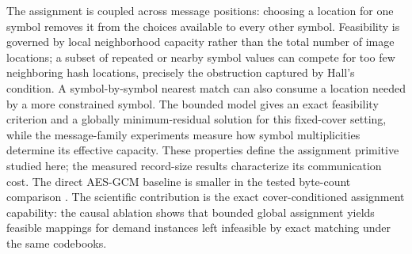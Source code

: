 \documentclass[preprint,12pt]{elsarticle}
\theoremstyle{plain}
\providecommand{\DIFaddtex}[1]{{\protect\color{blue} \sf #1}} %
\providecommand{\DIFdeltex}[1]{{\protect\color{red} \scriptsize #1}} %
\providecommand{\DIFaddbegin}{} %
\providecommand{\DIFaddend}{} %
\providecommand{\DIFdelbegin}{} %
\providecommand{\DIFdelend}{} %
\providecommand{\DIFadd}[1]{\texorpdfstring{\DIFaddtex{#1}}{#1}} %
\providecommand{\DIFdel}[1]{\texorpdfstring{\DIFdeltex{#1}}{}} %
\providecommand{\DIFscaledelfig}{0.5}
\newlength{\DIFdelgraphicswidth} %
\newlength{\DIFdelgraphicsheight} %
\providecommand{\DIFaddincludegraphics}[2][]{{\color{blue}\fbox{\DIFOincludegraphics[#1]{#2}}}} %
\providecommand{\DIFdelincludegraphics}[2][]{%
\sbox{\DIFdelgraphicsbox}{\DIFOincludegraphics[#1]{#2}}%
\settoboxwidth{\DIFdelgraphicswidth}{\DIFdelgraphicsbox} %
\settoboxtotalheight{\DIFdelgraphicsheight}{\DIFdelgraphicsbox} %
\scalebox{\DIFscaledelfig}{%
\parbox[b]{\DIFdelgraphicswidth}{\usebox{\DIFdelgraphicsbox}\\[-\baselineskip] \rule{\DIFdelgraphicswidth}{0em}}\llap{\resizebox{\DIFdelgraphicswidth}{\DIFdelgraphicsheight}{%
\setlength{\unitlength}{\DIFdelgraphicswidth}%
\begin{picture}(1,1)%
\thicklines\linethickness{2pt} %
{\color[rgb]{1,0,0}\put(0,0){\framebox(1,1){}}}%
{\color[rgb]{1,0,0}\put(0,0){\line( 1,1){1}}}%
{\color[rgb]{1,0,0}\put(0,1){\line(1,-1){1}}}%
\end{picture}%
}\hspace*{3pt}}} %
} %
\DeclareRobustCommand{\DIFaddbegin}{\DIFOaddbegin \let\includegraphics\DIFaddincludegraphics} %
\DeclareRobustCommand{\DIFaddend}{\DIFOaddend \let\includegraphics\DIFOincludegraphics} %
\DeclareRobustCommand{\DIFdelbegin}{\DIFOdelbegin \let\includegraphics\DIFdelincludegraphics} %
\DeclareRobustCommand{\DIFdelend}{\DIFOaddend \let\includegraphics\DIFOincludegraphics} %
\renewcommand{\DIFdel}[1]{}
\renewcommand{\DIFdelincludegraphics}[2][]{}
\begin{document}
The assignment is coupled across message positions: choosing a location for one
symbol removes it from the choices available to every other symbol. \DIFdelbegin \DIFdel{The }\DIFdelend \DIFaddbegin \DIFadd{Feasibility
is governed by local neighborhood capacity rather than the }\DIFaddend total number of
image locations\DIFdelbegin \DIFdel{therefore does not determine feasibility}\DIFdelend ; a subset of repeated or nearby symbol values can compete for
too few neighboring hash locations, precisely the obstruction captured by
Hall's condition. A
symbol-by-symbol nearest match can also consume a location needed by a more
constrained symbol. The bounded model gives an exact feasibility criterion and
a globally minimum-residual solution for this fixed-cover setting, while the
message-family experiments measure how symbol multiplicities determine its
effective capacity. These properties define the assignment primitive studied
here; the measured record-size results characterize its communication cost.
The direct AES-GCM baseline is smaller in the tested byte-count comparison\DIFdelbegin \DIFdel{;
FHAM therefore makes no claim of payload-efficiency or confidentiality gains
over direct encryption.
Its }\DIFdelend \DIFaddbegin \DIFadd{.
The }\DIFaddend scientific contribution is the exact cover-conditioned assignment
capability: the causal ablation shows that bounded global assignment \DIFdelbegin \DIFdel{recovers feasible mappings that exact matching cannot construct }\DIFdelend \DIFaddbegin \DIFadd{yields
feasible mappings for demand instances left infeasible by exact matching }\DIFaddend under
the same codebooks.
\end{document}
